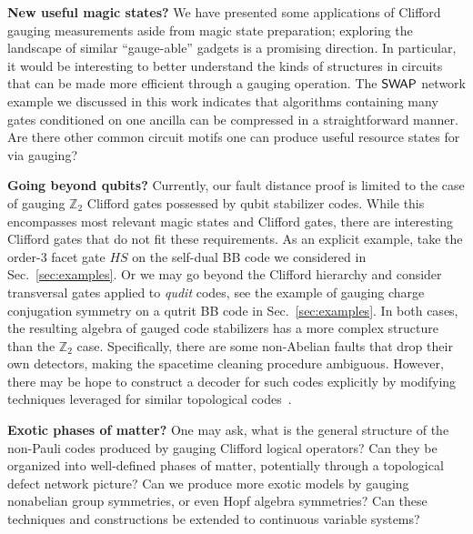\textbf{New useful magic states? }We have presented some applications of Clifford gauging measurements aside from magic state preparation; exploring the landscape of similar ``gauge-able'' gadgets is a promising direction. In particular, it would be interesting to better understand the kinds of structures in circuits that can be made more efficient through a gauging operation. The $\mathsf{SWAP}$ network example we discussed in this work indicates that algorithms containing many gates conditioned on one ancilla can be compressed in a straightforward manner. Are there other common circuit motifs one can produce useful resource states for via gauging?

\textbf{Going beyond qubits? }Currently, our fault distance proof is limited to the case of gauging $\mathbb{Z}_2$ Clifford gates possessed by qubit stabilizer codes. While this encompasses most relevant magic states and Clifford gates, there are interesting Clifford gates that do not fit these requirements. As an explicit example, take the order-3 facet gate $HS$ on the self-dual BB code we considered in Sec.~\ref{sec:examples}. Or we may go beyond the Clifford hierarchy and consider transversal gates  applied to \emph{qudit} codes, see the example of gauging charge conjugation symmetry on a qutrit BB code in Sec.~\ref{sec:examples}. In both cases, the resulting algebra of gauged code stabilizers has a more complex structure than the $\mathbb{Z}_2$ case. Specifically, there are some non-Abelian faults that drop their own detectors, making the spacetime cleaning procedure ambiguous. However, there may be hope to construct a decoder for such codes explicitly by modifying techniques leveraged for similar topological codes~\cite{lyons2026}. 


\textbf{Exotic phases of matter? }One may ask, what is the general structure of the non-Pauli codes produced by gauging Clifford logical operators? Can they be organized into well-defined phases of matter, potentially through a topological defect network picture? Can we produce more exotic models by gauging nonabelian group symmetries, or even Hopf algebra symmetries? Can these techniques and constructions be extended to continuous variable systems?


